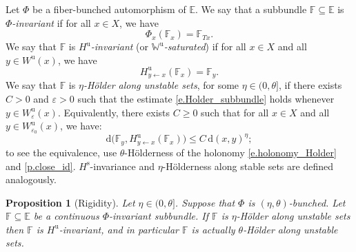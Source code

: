 \documentclass[10pt]{amsart}
\theoremstyle{plain}
\newtheorem{proposition}[theorem]{Proposition}
\theoremstyle{definition}
\newcommand{\EE}{\mathbb{E}}
\newcommand{\FF}{\mathbb{F}}
\newcommand{\WW}{\mathbb{W}}
\newcommand{\dd}{\mathrm{d}}
\newcommand{\uu}{\mathrm{u}}
\renewcommand{\ss}{\mathrm{s}}
\let\epsilon\varepsilon
\begin{document}
Let $\Phi$ be a fiber-bunched automorphism of $\EE$.
We say that a subbundle $\FF \subseteq \EE$ is \emph{$\Phi$-invariant} if for all $x \in X$, we have
\[
\Phi_x (\FF_x) = \FF_{Tx}.
\]
We say that $\FF$ is \emph{$H^\uu$-invariant} (or \emph{$\WW^\uu$-saturated})
if for all $x \in X$ and all $y \in W^\uu(x)$, we have
\[
H_{y \gets x}^\uu (\FF_x) = \FF_y.
\]
We say that $\FF$ is \emph{$\eta$-Hölder along unstable sets}, for some $\eta \in (0,\theta]$, if
there exists $C>0$ and $\epsilon>0$ such that the estimate \eqref{e.Holder_subbundle} holds whenever $y \in W^\uu_{\epsilon}(x)$.
Equivalently,
there exists $C \ge 0$ such that for all $x \in X$ and all $y \in W^\uu_{\epsilon_0}(x)$, we have:
\begin{equation}\label{e.Holder_section}
\dd \big( \FF_y, H^\uu_{y \gets x} (\FF_x) \big) \le C \, \dd(x,y)^{\eta} ;
\end{equation}
to see the equivalence, use $\theta$-Hölderness of the holonomy \eqref{e.holonomy_Holder} and \cref{p.close_id}.
$H^\ss$-invariance and $\eta$-Hölderness along stable sets are defined analogously.

\begin{proposition}[Rigidity] \label{p.rigidity}
Let $\eta \in (0,\theta]$.
Suppose that $\Phi$ is $(\eta,\theta)$-bunched.
Let $\FF \subseteq \EE$ be a continuous $\Phi$-invariant subbundle.
If $\FF$ is $\eta$-Hölder along unstable sets then
$\FF$ is $H^\uu$-invariant, and in particular
$\FF$ is actually $\theta$-Hölder along unstable sets.
\end{proposition}
\end{document}
